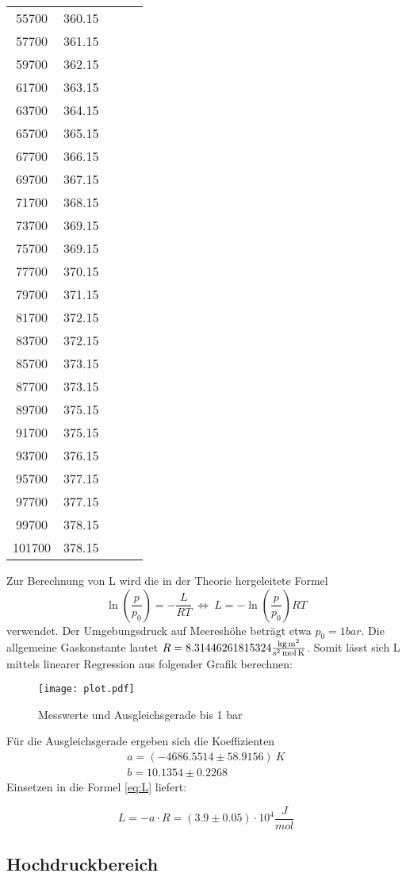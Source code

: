 \begin{table}[H]
\begin{tabular}{c c c c c}
      55700 &   360.15 \\ 
      57700 &   361.15 \\ 
      59700 &   362.15 \\ 
      61700 &   363.15 \\ 
      63700 &   364.15 \\ 
      65700 &   365.15 \\ 
      67700 &   366.15 \\ 
      69700 &   367.15 \\ 
      71700 &   368.15 \\ 
      73700 &   369.15 \\ 
      75700 &   369.15 \\ 
      77700 &   370.15 \\ 
      79700 &   371.15 \\ 
      81700 &   372.15 \\ 
      83700 &   372.15 \\ 
      85700 &   373.15 \\ 
      87700 &   373.15 \\
      89700 &   375.15 \\ 
      91700 &   375.15 \\ 
      93700 &   376.15 \\ 
      95700 &   377.15 \\ 
      97700 &   377.15 \\ 
      99700 &   378.15 \\ 
      101700 &   378.15 \\ 
    \bottomrule
    \end{tabular}
  \end{table}

  \noindent Zur Berechnung von L wird die in der Theorie hergeleitete Formel 
  \begin{equation}
    \label{eq:L}
    \ln{(\dfrac{p}{p_0})}=-\dfrac{L}{RT}\ \Leftrightarrow \ L=-\ln{(\dfrac{p}{p_0})}RT
  \end{equation} 
  verwendet. Der Umgebungsdruck auf Meereshöhe beträgt etwa
  $p_0=1 bar$. Die allgemeine Gaskonstante lautet $R=8.31446261815324
  {\displaystyle \textstyle {\frac {\mathrm {kg\,m^{2}} }{\mathrm {s^{2}\,mol\,K} }}} $. Somit lässt 
  sich L mittels linearer Regression aus folgender Grafik berechnen: 
  \begin{figure}[H]
   \centering
   \texttt{[image: plot.pdf]}
   \caption{Messwerte und Ausgleichsgerade bis 1 bar}
   \label{fig:plot}
  \end{figure}
  \noindent Für die Ausgleichsgerade ergeben sich die Koeffizienten
  \begin{align*}
   a=(-4686.5514 \pm 58.9156)\ K\\
   b=10.1354 \pm 0.2268
  \end{align*}
  \noindent Einsetzen in die Formel \eqref{eq:L} liefert:

  \begin{equation*}
    L= - a \cdot R = (3.9 \pm 0.05) \cdot 10^4 \dfrac{J}{mol}
  \end{equation*}
\subsection{Hochdruckbereich}

